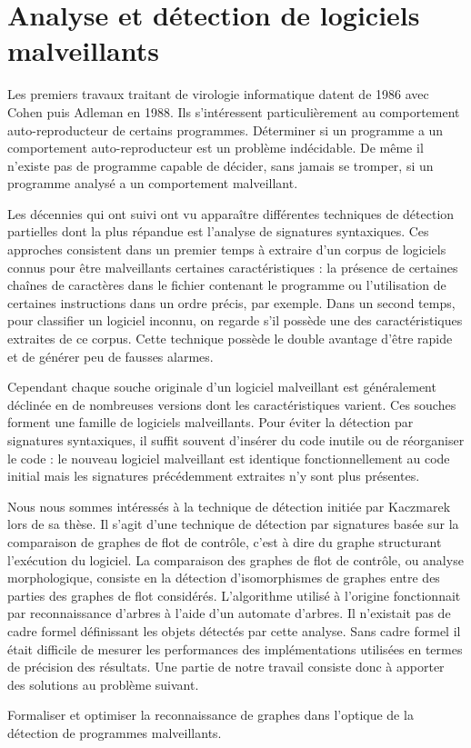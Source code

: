 \section*{Analyse et détection de logiciels malveillants}
Les premiers travaux traitant de virologie informatique datent de 1986 avec Cohen \cite{Cohen86} puis Adleman \cite{Adleman88} en 1988. Ils s'intéressent particulièrement au comportement auto-reproducteur de certains programmes. Déterminer si un programme a un comportement auto-reproducteur est un problème indécidable. De même il n'existe pas de programme capable de décider, sans jamais se tromper, si un programme analysé a un comportement malveillant.

Les décennies qui ont suivi ont vu apparaître différentes techniques de détection partielles dont la plus répandue est l'analyse de signatures syntaxiques. Ces approches consistent dans un premier temps à extraire d'un corpus de logiciels connus pour être malveillants certaines caractéristiques : la présence de certaines chaînes de caractères dans le fichier contenant le programme ou l'utilisation de certaines instructions dans un ordre précis, par exemple. Dans un second temps, pour classifier un logiciel inconnu, on regarde s'il possède une des caractéristiques extraites de ce corpus.
Cette technique possède le double avantage d'être rapide et de générer peu de fausses alarmes.

Cependant chaque souche originale d'un logiciel malveillant est généralement déclinée en de nombreuses versions dont les caractéristiques varient. Ces souches forment une famille de logiciels malveillants. Pour éviter la détection par signatures syntaxiques, il suffit souvent d'insérer du code inutile ou de réorganiser le code : le nouveau logiciel malveillant est identique fonctionnellement au code initial mais les signatures précédemment extraites n'y sont plus présentes.

Nous nous sommes intéressés à la technique de détection initiée par Kaczmarek \cite{BKM08} lors de sa thèse. Il s'agit d'une technique de détection par signatures basée sur la comparaison de graphes de flot de contrôle, c'est à dire du graphe structurant l'exécution du logiciel.
La comparaison des graphes de flot de contrôle, ou analyse morphologique, consiste en la détection d'isomorphismes de graphes entre des parties des graphes de flot considérés. 
L'algorithme utilisé à l'origine fonctionnait par reconnaissance d'arbres à l'aide d'un automate d'arbres. Il n'existait pas de cadre formel définissant les objets détectés par cette analyse. Sans cadre formel il était difficile de mesurer les performances des implémentations utilisées en termes de précision des résultats.
Une partie de notre travail consiste donc à apporter des solutions au problème suivant.
\begin{pbb}
 Formaliser et optimiser la reconnaissance de graphes dans l'optique de la détection de programmes malveillants.
\end{pbb}

